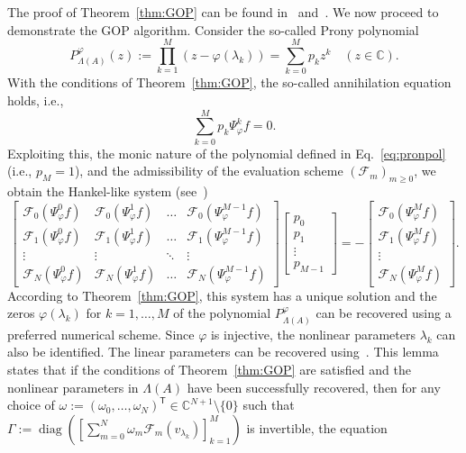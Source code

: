 \documentclass{arxiv}
\newcommand{\T}{\mathsf{T}}
\begin{document}
The proof of Theorem~\ref{thm:GOP} can be found in~\cite{stampfer2019generalized} and~\cite{stampfer2020generalized}. We now proceed to demonstrate the GOP algorithm. Consider the so-called Prony polynomial
\begin{equation}
    \label{eq:pronpol}
    P_{\Lambda(A)}^{\varphi}(z) := \prod_{k=1}^M (z - \varphi(\lambda_k)) = \sum_{k=0}^M p_k z^{k} \quad (z \in \mathbb{C}).
\end{equation}
With the conditions of Theorem~\ref{thm:GOP}, the so-called annihilation equation holds, i.e., 
\begin{equation}
    \label{eq:anniheq}
    \sum_{k=0}^{M} p_k \Psi_{\varphi}^k f = 0.
\end{equation}
Exploiting this, the monic nature of the polynomial defined in Eq.~\eqref{eq:pronpol} (i.e., $p_M = 1$), and the admissibility of the evaluation scheme ${(\mathcal{F}_m)}_{m \ge 0}$, we obtain the Hankel-like system (see~\cite[Lem.~2.3.8]{stampfer2019generalized})
\begin{equation}
    \label{eq:hank}
    \begin{bmatrix}
         \mathcal{F}_0(\Psi_{\varphi}^{0} f) & \mathcal{F}_0(\Psi_{\varphi}^{1} f) & \ldots & \mathcal{F}_0(\Psi_{\varphi}^{M-1} f) \\
         \mathcal{F}_1(\Psi_{\varphi}^{0} f) & \mathcal{F}_1(\Psi_{\varphi}^{1} f) & \ldots & \mathcal{F}_1(\Psi_{\varphi}^{M-1} f) \\
         \vdots & \vdots & \ddots & \vdots \\
         \mathcal{F}_N(\Psi_{\varphi}^{0} f) & \mathcal{F}_N(\Psi_{\varphi}^{1} f) & \ldots & \mathcal{F}_N(\Psi_{\varphi}^{M-1} f)
    \end{bmatrix} \begin{bmatrix}
         p_0  \\
         p_1 \\
         \vdots \\
         p_{M-1}
    \end{bmatrix} = -\begin{bmatrix}
         \mathcal{F}_0(\Psi_{\varphi}^{M} f) \\
         \mathcal{F}_1(\Psi_{\varphi}^{M} f) \\
         \vdots \\
         \mathcal{F}_N(\Psi_{\varphi}^{M} f)
    \end{bmatrix}.
\end{equation}
According to Theorem~\ref{thm:GOP}, this system has a unique solution and the zeros $\varphi(\lambda_k)$ for $k=1,\ldots,M$ of the polynomial $P_{\Lambda(A)}^{\varphi}$ can be recovered using a preferred numerical scheme. Since $\varphi$ is injective, the nonlinear parameters $\lambda_k$ can also be identified. The linear parameters can be recovered using~\cite[Lem.~2.2.14]{stampfer2019generalized}. This lemma states that if the conditions of Theorem~\ref{thm:GOP} are satisfied and the nonlinear parameters in $\Lambda(A)$ have been successfully recovered, then for any choice of $\omega := (\omega_0, \ldots, \omega_N)^\T \in \mathbb{C}^{N+1} \setminus \{0\}$ such that $\Gamma := \operatorname{diag} \left( \left[ \sum_{m=0}^N \omega_m \mathcal{F}_m(v_{\lambda_k})\right]_{k=1}^M \right)$ is invertible, the equation
\end{document}
